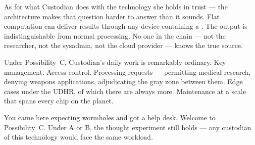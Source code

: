 As for what Custodian does with the technology she holds in trust --- the architecture makes that question harder to answer than it sounds. Flat computation can deliver results through any device containing a . The output is indistinguishable from normal processing. No one in the chain --- not the researcher, not the sysadmin, not the cloud provider --- knows the true source.

Under Possibility~C, Custodian's daily work is remarkably ordinary. Key management. Access control. Processing requests --- permitting medical research, denying weapons applications, adjudicating the gray zone between them. Edge cases under the UDHR, of which there are always more. Maintenance at a scale that spans every chip on the planet.

You came here expecting wormholes and got a help desk. Welcome to Possibility~C. Under A or B, the thought experiment still holds --- any custodian of this technology would face the same workload.

\chapterreturn
